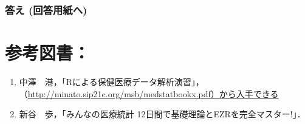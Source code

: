 \documentclass[11pt,]{problemset}
\providecommand{\tightlist}{%
  \setlength{\itemsep}{0pt}\setlength{\parskip}{0pt}}
\begin{document}
\hypertarget{--9}{%
\subsubsection{答え (回答用紙へ)}\label{--9}}

\section{参考図書：}

\begin{enumerate}
\def\labelenumi{\arabic{enumi}.}
\tightlist
\item
  中澤　港，「Rによる保健医療データ解析演習」，\newline（\url{http://minato.sip21c.org/msb/medstatbookx.pdf）から入手できる}
\item
  新谷　歩，「みんなの医療統計 12日間で基礎理論とEZRを完全マスター!」．
\end{enumerate}
\end{document}
